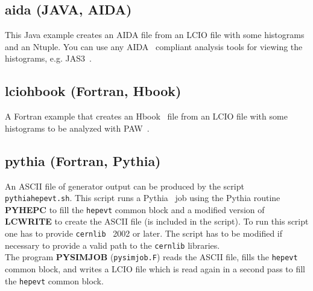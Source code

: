 \documentclass[twoside]{article}
\begin{document}
\subsection{aida (JAVA, AIDA)} \label{rwaida}

This Java example creates an AIDA file from an LCIO file with some histograms
and an Ntuple. You can use any AIDA~\cite{ref_aida} compliant analysis tools for 
viewing the histograms, e.g. JAS3~\cite{ref_jas}.

\subsection{lciohbook (Fortran, Hbook)} \label{rwhbook}

A Fortran example that creates an Hbook~\cite{ref_cernlib} file from an LCIO file with 
some histograms to be analyzed with PAW~\cite{ref_cernlib}.

\subsection{pythia (Fortran, Pythia)} \label{rwpythia}

An ASCII file of generator output can be produced by the script \verb$pythiahepevt.sh$.
This script runs a Pythia~\cite{ref_pythia} job
using the Pythia routine {\bf PYHEPC} to fill the \verb$hepevt$ common block 
and a modified version of {\bf LCWRITE} to create the ASCII file (is included in the script). To run this script
one has to provide \verb$cernlib$~\cite{ref_cernlib} 2002 or later. The script has to be modified if necessary
to provide a valid path to the \verb$cernlib$ libraries. \\
The program {\bf PYSIMJOB} (\verb$pysimjob.F$) reads the ASCII file, fills the \verb$hepevt$ common 
block, and writes a LCIO file which is read again in a second pass to fill the \verb$hepevt$ common 
block.


\newpage 
\begin{latexonly}
\end{latexonly}
\end{document}
